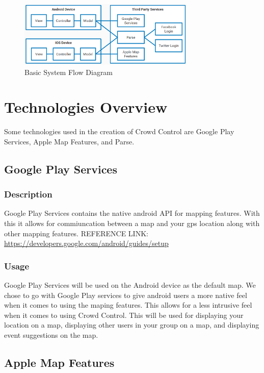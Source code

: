 \begin{figure}[tbh]
\begin{center}
\includegraphics[width=0.75\textwidth]{designpictures/ModuleFlowDiagram.png}
\end{center}
\caption{Basic System Flow Diagram \label{ModuleFlowDiagram}}
\end{figure}

\section{Technologies Overview}
Some technologies used in the creation of Crowd Control are Google Play Services, Apple Map Features, and Parse.

\subsection{Google Play Services}
	\subsubsection{Description}
	Google Play Services contains the native android API for mapping features. With this it allows for commiuncation between a map and your gps location along with other mapping features.
\newline
REFERENCE LINK:  \url{https://developers.google.com/android/guides/setup}
	\subsubsection{Usage}
	Google Play Services will be used on the Android device as the default map. We chose to go with Google Play services to give android users a more native feel when it comes to using the maping features. This allows for a less intrusive feel when it comes to using Crowd Control. This will be used for displaying your location on a map, displaying other users in your group on a map, and displaying event suggestions on the map.

\subsection{Apple Map Features}
